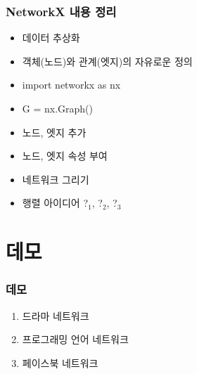 \documentclass{beamer}
\begin{document}
\begin{frame}[fragile]
\frametitle{NetworkX 내용 정리}
\begin{itemize}
\item 데이터 추상화
\item 객체(노드)와 관계(엣지)의 자유로운 정의
\item import networkx as nx
\item G = nx.Graph()
\item 노드, 엣지 추가
\item 노드, 엣지 속성 부여
\item 네트워크 그리기
\item 행렬 아이디어 ?$_1$, ?$_2$, ?$_3$
\end{itemize}
\end{frame}

\section{데모}
\begin{frame}
\frametitle{데모}
\begin{enumerate}
\item 드라마 네트워크
\item 프로그래밍 언어 네트워크
\item 페이스북 네트워크
\end{enumerate}
\end{frame}
\end{document}

